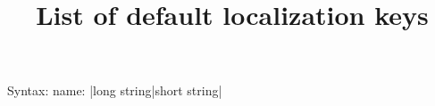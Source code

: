 \documentclass{article}
\title{List of default localization keys}
\author{}
\begin{document}
\maketitle{}

Syntax:  name: |long string|short string|

\makeatletter
\blx@bibinit

\def\do#1{\item \texttt{#1}:\quad|\biblstring{#1}\relax|\bibsstring{#1}\relax|}

\begin{itemize}
\abx@dostrings
\end{itemize}
\makeatother
\end{document}
